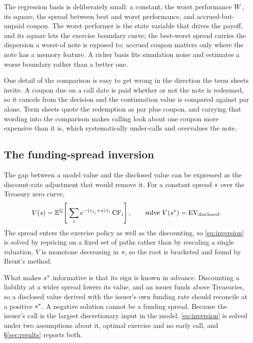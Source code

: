 The regression basis is deliberately small: a constant, the worst performance
$W$, its square, the spread between best and worst performance, and
accrued-but-unpaid coupon. The worst performer is the state variable that drives
the payoff, and its square lets the exercise boundary curve; the best-worst
spread carries the dispersion a worst-of note is exposed to; accrued coupon
matters only where the note has a memory feature. A richer basis fits
simulation noise and estimates a worse boundary rather than a better one.

One detail of the comparison is easy to get wrong in the direction the term
sheets invite. A coupon due on a call date is paid whether or not the note is
redeemed, so it cancels from the decision and the continuation value is
compared against par alone. Term sheets quote the redemption as par plus
coupon, and carrying that wording into the comparison makes calling look about
one coupon more expensive than it is, which systematically under-calls and
overvalues the note.

\subsection{The funding-spread inversion}

The gap between a model value and the disclosed value can be expressed as the
discount-rate adjustment that would remove it. For a constant spread $s$
over the Treasury zero curve,
%
\begin{equation}
  V(s) = \mathbb{E}^{\mathbb{Q}}\!\left[\;\sum_i
    e^{-(r_{t_i} + s)\,t_i}\, \mathrm{CF}_i \right],
  \qquad
  \text{solve } V(s^\ast) = \mathrm{EV}_{\text{disclosed}} .
  \label{eq:inversion}
\end{equation}
%
The spread enters the exercise policy as well as the discounting, so
\eqref{eq:inversion} is solved by repricing on a fixed set of paths rather than
by rescaling a single valuation. $V$ is monotone decreasing in $s$, so the
root is bracketed and found by Brent's method.

What makes $s^\ast$ informative is that its sign is known in advance.
Discounting a liability at a wider spread lowers its value, and an issuer funds
above Treasuries, so a disclosed value derived with the issuer's own funding
rate should reconcile at a positive $s^\ast$. A negative solution cannot
be a funding spread. Because the issuer's call is the largest discretionary
input in the model, \eqref{eq:inversion} is solved under two assumptions about
it, optimal exercise and no early call, and \S\ref{sec:results} reports both.
